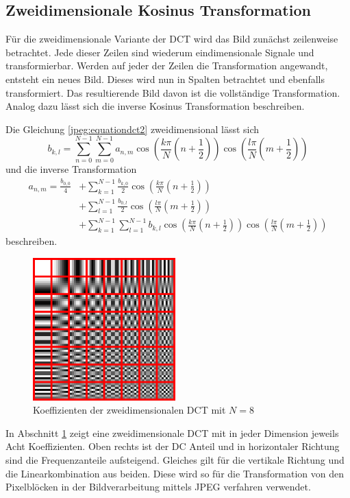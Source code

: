 \subsection{Zweidimensionale Kosinus Transformation
\label{jpeg:subsection:dctdim2}}
Für die zweidimensionale Variante der DCT wird das Bild zunächst zeilenweise betrachtet. Jede dieser Zeilen sind wiederum eindimensionale Signale und transformierbar.
Werden auf jeder der Zeilen die Transformation angewandt, entsteht ein neues Bild.
Dieses wird nun in Spalten betrachtet und ebenfalls transformiert.
Das resultierende Bild davon ist die vollständige Transformation.
Analog dazu lässt sich die inverse Kosinus Transformation beschreiben.

Die Gleichung \eqref{jpeg:equationdct2} zweidimensional lässt sich
\begin{equation}
    b_{k,l}
    =
    \sum \limits_{n=0}^{N-1} 
    \sum \limits_{m=0}^{N-1} a_{n,m} 
    \cos\left(
    \frac{k\pi}{N}\left(n + \frac{1}{2} \right) 
    \right)
    \cos\left(
    \frac{l\pi}{N}\left(m + \frac{1}{2} \right) 
    \right)
    \label{jpeg:equationdct2dim2}
\end{equation}
und die inverse Transformation  
\begin{align*}
    a_{n,m}
    =
    \frac{b_{0,0}}{4} &+
    \sum \limits_{k=1}^{N-1} 
    \frac{b_{k,0}}{2} 
    \cos\left(
    \frac{k\pi}{N}\left(n + \frac{1}{2} \right) 
    \right) \\ &+
    \sum \limits_{l=1}^{N-1} 
    \frac{b_{0,l}}{2} 
    \cos\left(
    \frac{l\pi}{N}\left(m + \frac{1}{2} \right) 
    \right) \\ &+
    \sum \limits_{k=1}^{N-1} 
    \sum \limits_{l=1}^{N-1} b_{k,l} 
    \cos\left(
    \frac{k\pi}{N}\left(n + \frac{1}{2} \right) 
    \right)
    \cos\left(
    \frac{l\pi}{N}\left(m + \frac{1}{2} \right) 
    \right)
    \label{jpeg:equationdct3dim2}
\end{align*}
beschreiben.

\begin{figure}
    \centering
    \includegraphics[width=55mm]{papers/jpeg/pictures/dctjpeg.pdf}
    \caption{Koeffizienten der zweidimensionalen DCT mit \(N=8\)
        \label{jpeg:fig:dctkoeff}}
\end{figure}

In Abschnitt \ref{jpeg:fig:dctkoeff}  zeigt eine zweidimensionale DCT mit in jeder Dimension jeweils Acht Koeffizienten.
Oben rechts ist der DC Anteil und in horizontaler Richtung sind die Frequenzanteile aufsteigend.
Gleiches gilt für die vertikale Richtung und die Linearkombination aus beiden.
Diese wird so für die Transformation von den Pixelblöcken in der Bildverarbeitung mittels JPEG verfahren verwendet.

